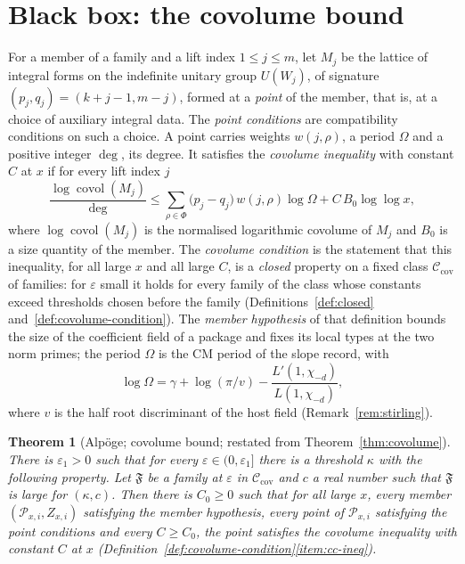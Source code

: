 \documentclass[11pt]{amsbook}
\theoremstyle{plain}
\newtheorem{theorem}{Theorem}[section]
\theoremstyle{definition}
\theoremstyle{remark}
\numberwithin{equation}{section}
\numberwithin{figure}{chapter}
\numberwithin{table}{chapter}
\newcommand{\eps}{\varepsilon}
\newcommand{\Fam}{\mathfrak{F}}
\begin{document}
\section{Black box: the covolume bound}
\label{sec:bb-covolume}

For a member of a family and a lift index $1\le j\le m$, let $M_j$ be
the lattice of integral forms on the indefinite unitary group
$U(W_j)$, of signature $(p_j,q_j)=(k+j-1,m-j)$, formed at a
\emph{point} of the member, that is, at a choice of auxiliary
integral data. The \emph{point conditions} are compatibility
conditions on such a choice. A point carries weights $w(j,\rho)$, a
period $\Omega$ and a positive integer $\deg$, its degree. It
satisfies the \emph{covolume inequality} with constant $C$ at $x$ if
for every lift index $j$
\[
\frac{\log\operatorname{covol}(M_j)}{\deg}\le\sum_{\rho\in\Phi}
\bigl(p_j-q_j\bigr)\,w(j,\rho)\log\Omega+C\,B_0\log\log x,
\]
where $\log\operatorname{covol}(M_j)$ is the normalised logarithmic
covolume of $M_j$ and $B_0$ is a size quantity of the member. The
\emph{covolume condition} is the statement that this inequality, for
all large $x$ and all large $C$, is a \emph{closed} property on a
fixed class $\mathcal C_{\mathrm{cov}}$ of families: for $\eps$ small
it holds for every family of the class whose constants exceed
thresholds chosen before the family (Definitions~\ref{def:closed}
and~\ref{def:covolume-condition}). The \emph{member hypothesis} of
that definition bounds the size of the coefficient field of a
package and fixes its local types at the two norm primes; the period
$\Omega$ is the CM period of the slope record, with
\[
\log\Omega=\gamma+\log(\pi/v)-\frac{L'(1,\chi_{-d})}{L(1,\chi_{-d})},
\]
where $v$ is the half root discriminant of the host field
(Remark~\ref{rem:stirling}).

\begin{theorem}[Alp\"oge; covolume bound; restated from
Theorem~\ref{thm:covolume}]
\label{bb:covolume}
There is $\eps_1>0$ such that for every
$\eps\in(0,\eps_1]$ there is a threshold $\kappa$ with the following
property. Let $\Fam$ be a family at $\eps$ in $\mathcal
C_{\mathrm{cov}}$ and $c$ a real number such that $\Fam$ is large for
$(\kappa,c)$. Then there is $C_0\ge0$ such that for all large $x$,
every member $(\mathcal P_{x,i},Z_{x,i})$ satisfying the member
hypothesis, every point of $\mathcal P_{x,i}$ satisfying the point
conditions and every $C\ge C_0$, the point satisfies the covolume
inequality with constant $C$ at $x$
(Definition~\ref{def:covolume-condition}\ref{item:cc-ineq}).
\end{theorem}
\end{document}
